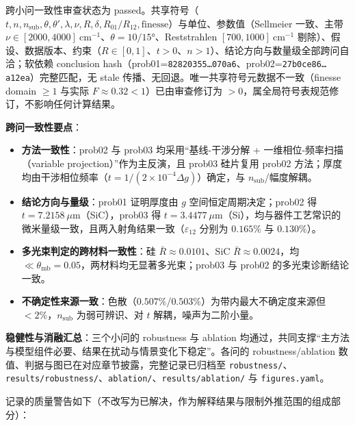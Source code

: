 跨小问一致性审查状态为
passed。共享符号（\(t,n,n_{\mathrm{sub}},\theta,\theta',\lambda,\nu,R,\delta,R_{01}/R_{12},\mathrm{finesse}\)）与单位、参数值（Sellmeier
一致、主带
\(\nu\in[2000,4000]\ \mathrm{cm}^{-1}\)、\(\theta=10/15°\)、Reststrahlen
\([700,1000]\ \mathrm{cm}^{-1}\)
剔除）、假设、数据版本、约束（\(R\in[0,1]\)、\(t>0\)、\(n>1\)）、结论方向与数量级全部跨问自洽；软依赖
conclusion
hash（prob01=\texttt{82820355…070a6}、prob02=\texttt{27b0ce86…a12ea}）完整匹配，无
stale 传播、无回退。唯一共享符号元数据不一致（finesse domain \(\ge1\)
与实际 \(F\approx0.32<1\)）已由审查修订为
\(>0\)，属全局符号表规范修订，不影响任何计算结果。

\textbf{跨问一致性要点}：

\begin{itemize}
\tightlist
\item
  \textbf{方法一致性}：prob02 与 prob03 均采用``基线-干涉分解 +
  一维相位-频率扫描（variable projection）''作为主反演，且 prob03
  硅片复用 prob02
  方法；厚度均由干涉相位频率（\(t=1/(2\times10^{-4}\Delta g)\)）确定，与
  \(n_{\mathrm{sub}}\)/幅度解耦。
\item
  \textbf{结论方向与量级}：prob01 证明厚度由 \(g\)
  空间恒定周期决定；prob02 得 \(t=7.2158\ \mu\mathrm{m}\)（SiC），prob03
  得
  \(t=3.4477\ \mu\mathrm{m}\)（Si），均与器件工艺常识的微米量级一致，且两入射角结果一致（\(\varepsilon_{12}\)
  分别为 \(0.165\%\) 与 \(0.130\%\)）。
\item
  \textbf{多光束判定的跨材料一致性}：硅 \(\bar R\approx0.0101\)、SiC
  \(\bar R\approx0.0024\)，均
  \(\ll\theta_{\mathrm{mb}}=0.05\)，两材料均无显著多光束；prob03 与
  prob02 的多光束诊断结论一致。
\item
  \textbf{不确定性来源一致}：色散（\(0.507\%\)/\(0.503\%\)）为带内最大不确定度来源但
  \(<2\%\)，\(n_{\mathrm{sub}}\) 为弱可辨识、对 \(t\)
  解耦，噪声为二阶小量。
\end{itemize}

\textbf{稳健性与消融汇总}：三个小问的 robustness 与 ablation
均通过，共同支撑``主方法与模型组件必要、结果在扰动与情景变化下稳定''。各问的
robustness/ablation 数值、判据与图已在对应章节披露，完整记录已归档至
\texttt{robustness/}、\texttt{results/robustness/}、\texttt{ablation/}、\texttt{results/ablation/}
与 \texttt{figures.yaml}。

记录的质量警告如下（不改写为已解决，作为解释结果与限制外推范围的组成部分）：

